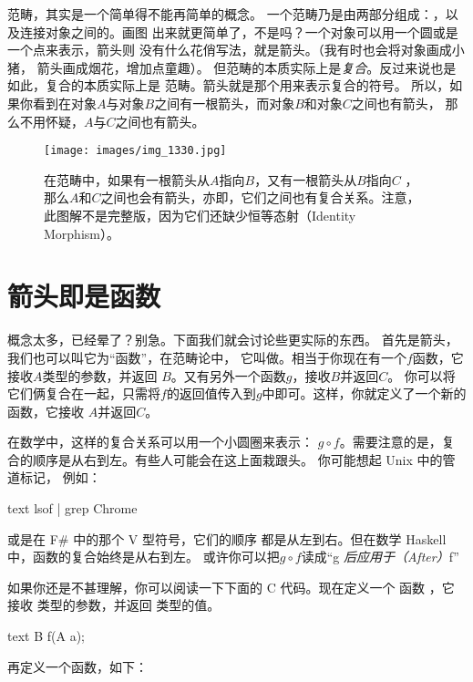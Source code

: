 
\lettrine[lhang=0.17]{范}{畴}，其实是一个简单得不能再简单的概念。
一个范畴乃是由两部分组成：，以及连接对象之间的。画图
出来就更简单了，不是吗？一个对象可以用一个圆或是一个点来表示，箭头则
没有什么花俏写法，就是箭头。（我有时也会将对象画成小猪，
箭头画成烟花，增加点童趣）。
但范畴的本质实际上是\emph{复合}。反过来说也是如此，复合的本质实际上是
范畴。箭头就是那个用来表示复合的符号。
所以，如果你看到在对象$A$与对象$B$之间有一根箭头，而对象$B$和对象$C$之间也有箭头，
那么不用怀疑，$A$与$C$之间也有箭头。


\begin{figure}
  \centering
  \texttt{[image: images/img\_1330.jpg]}
  \caption{在范畴中，如果有一根箭头从$A$指向$B$，又有一根箭头从$B$指向$C$
，那么$A$和$C$之间也会有箭头，亦即，它们之间也有复合关系。注意，此图解不是完整版，因为它们还缺少恒等态射（Identity Morphism）。}

\end{figure}

\section{箭头即是函数}

概念太多，已经晕了？别急。下面我们就会讨论些更实际的东西。
首先是箭头，我们也可以叫它为“函数”，在范畴论中，
它叫做。相当于你现在有一个$f$函数，它接收$A$类型的参数，并返回
$B$。又有另外一个函数$g$，接收$B$并返回$C$。
你可以将它们俩复合在一起，只需将$f$的返回值传入到$g$中即可。这样，你就定义了一个新的函数，它接收
$A$并返回$C$。

在数学中，这样的复合关系可以用一个小圆圈来表示：
$g \circ f$。需要注意的是，复合的顺序是从右到左。有些人可能会在这上面栽跟头。
你可能想起 Unix 中的管道标记，
例如：

\begin{snip}{text}
lsof | grep Chrome
\end{snip}
或是在 F\# 中的那个 V 型符号\code{>>}，它们的顺序
都是从左到右。但在数学 Haskell 中，函数的复合始终是从右到左。
或许你可以把$g \circ f$读成“g\emph{ 后应用于（After）}f”

如果你还是不甚理解，你可以阅读一下下面的 C 代码。现在定义一个
函数 ，它接收  类型的参数，并返回 
 类型的值。

\begin{snip}{text}
B f(A a);
\end{snip}
再定义一个函数，如下：

